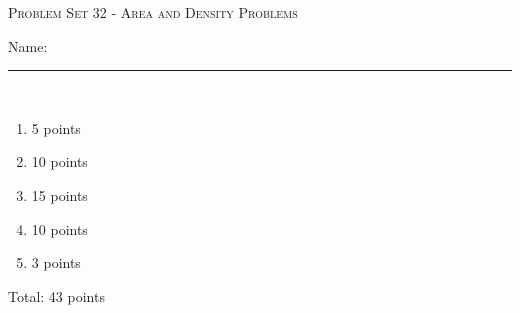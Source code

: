 \documentclass{article}
\begin{document}
\begin{center}
  \large\textsc{Problem Set 32 - Area and Density Problems}
  
      \pspace{12pt}
  \begin{problemonly}\large Name: \rule{5cm}{0.15mm}\\ \end{problemonly}
\end{center}

\begin{grading}

    \begin{enumerate}
    \item 5 points
    \item 10 points
    \item 15 points
    \item 10 points
    \item 3 points
    \end{enumerate}
  Total: 43 points
\end{grading}
\end{document}
